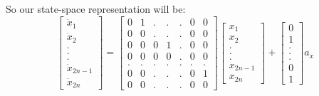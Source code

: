 \documentclass[10pt,letterpaper]{article}
\begin{document}
\begin{flushleft}
So our state-space representation will be:
\begin{equation}
\begin{bmatrix}
\dot{x}_1\\ 
\dot{x}_2\\
.\\
.\\
.\\
\dot{x}_{2n-1}\\
\dot{x}_{2n}

\end{bmatrix} = \begin{bmatrix}
0 & 1 & . & . & . & 0 & 0 \\
0 & 0 & . & . & . & 0 & 0 \\
0 & 0 & 0 & 1 & . & 0 & 0 \\
0 & 0 & 0 & 0 & . & 0 & 0 \\
. & . & . & . & . & . & . \\
0 & 0 & . & . & . & 0 & 1 \\
0 & 0 & . & . & . & 0 & 0 
\end{bmatrix}  \begin{bmatrix}
x_1\\
x_2\\
.\\
.\\
.\\
x_{2n-1}\\
x_{2n}
\end{bmatrix} + \begin{bmatrix}
0\\
1\\
.\\
.\\
.\\
0\\
1
\end{bmatrix} a_x
\end{equation}


\end{flushleft}
\end{document}
